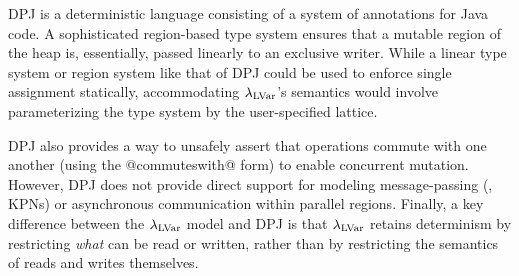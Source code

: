 DPJ \cite{dpj-hotpar09} is a deterministic language
consisting of a system of annotations for Java code.  A sophisticated
region-based type system ensures that a mutable region of the heap is,
essentially, passed linearly to an exclusive writer.
While a linear type system or region system like that of DPJ
could be used to enforce single assignment statically, accommodating $\textup{\ensuremath{\lambda_{\textrm{LVar}}}}$'s
semantics would involve parameterizing the
type system by the user-specified lattice.

DPJ also
provides a way to unsafely assert that operations commute with one another (using the @commuteswith@ form) to enable
concurrent mutation.  However, DPJ does not provide direct support for
modeling message-passing (\eg, KPNs) or asynchronous communication
within parallel regions.  
Finally, a key difference between the $\textup{\ensuremath{\lambda_{\textrm{LVar}}}}$ model and DPJ 
is that $\textup{\ensuremath{\lambda_{\textrm{LVar}}}}$ retains determinism by restricting {\em
  what} can be read or written, rather than by restricting 
the semantics of reads and writes themselves.


%





